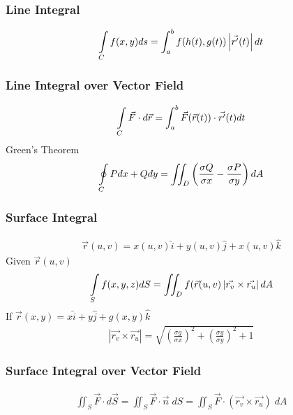 \documentclass{article}
\begin{document}
        \subsubsection{Line Integral}
            \begin{align*}
                \int\displaylimits_C f(x,y) ds = \int_a^b f(h(t),g(t))\left|\vec{r'}(t)\right|dt
            \end{align*}
        \subsubsection{Line Integral over Vector Field}
            \begin{align*}
                \int\displaylimits_C \vec{F}\cdot d\vec{r} = \int_a^b \vec{F}(\vec{r}(t))\cdot\vec{r'}(t)dt
            \end{align*}
        \indent Green's Theorem
            \begin{align*}
                \oint\displaylimits_C Pdx+Qdy = 
                \iint_D \left(\frac{\sigma Q}{\sigma x} - \frac{\sigma P}{\sigma y}\right)dA
            \end{align*}
        \subsubsection{Surface Integral}
            \begin{align*}
                \vec{r}(u,v) = x(u,v)\hat{i}+y(u,v)\hat{j}+x(u,v)\hat{k}
            \end{align*}
        \indent Given $\vec{r}(u,v)$
            \begin{align*}
                \int\displaylimits_S f(x,y,z)dS = \iint_D f(\vec{r}(u,v)\left|\vec{r_v}\times\vec{r_u}\right|dA
            \end{align*}
        \indent \;If $\vec{r}(x,y) = x\hat{i}+y\hat{j}+g(x,y)\hat{k}$
            \begin{align*}
                \left|\vec{r_v}\times\vec{r_u}\right|
                =\sqrt{\left(\frac{\sigma g}{\sigma x}\right)^2+\left(\frac{\sigma g}{\sigma y}\right)^2+1}
            \end{align*}
        \subsubsection{Surface Integral over Vector Field}
            \begin{align*}
                \iint_S\vec{F}\cdot d\vec{S} = \iint_S\vec{F}\cdot\vec{n}\;dS = \iint_S\vec{F}\cdot(\vec{r_v}\times\vec{r_u})\;dA
            \end{align*}
\end{document}

